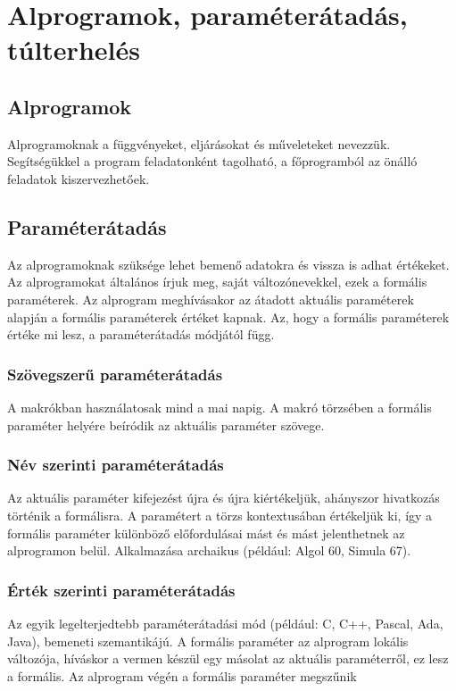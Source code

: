 \documentclass[margin=0px]{article}
\begin{document}
\section{Alprogramok, paraméterátadás, túlterhelés}

\subsection{Alprogramok}

Alprogramoknak a függvényeket, eljárásokat és műveleteket nevezzük. Segítségükkel a program feladatonként tagolható, a főprogramból az önálló feladatok kiszervezhetőek.

\subsection{Paraméterátadás}

Az alprogramoknak szüksége lehet bemenő adatokra és vissza is adhat értékeket. Az alprogramokat általános írjuk meg, saját változónevekkel, ezek a formális paraméterek. Az alprogram meghívásakor az átadott aktuális paraméterek alapján a formális paraméterek értéket kapnak. Az, hogy a formális paraméterek értéke mi lesz, a paraméterátadás módjától függ.

\subsubsection{Szövegszerű paraméterátadás}

A makrókban használatosak mind a mai napig. A makró törzsében a formális paraméter helyére beíródik az aktuális paraméter szövege.

\subsubsection{Név szerinti paraméterátadás}

Az aktuális paraméter kifejezést újra és újra kiértékeljük, ahányszor hivatkozás történik a formálisra. A paramétert a törzs kontextusában értékeljük ki, így a formális paraméter különböző előfordulásai mást és mást jelenthetnek az alprogramon belül.
Alkalmazása archaikus (például: Algol 60, Simula 67).

\subsubsection{Érték szerinti paraméterátadás}

Az egyik legelterjedtebb paraméterátadási mód (például: C, C++, Pascal, Ada, Java), bemeneti szemantikájú. A formális paraméter az alprogram lokális változója, híváskor a vermen készül egy másolat az aktuális paraméterről, ez lesz a formális. Az alprogram végén a formális paraméter megszűnik
\end{document}
